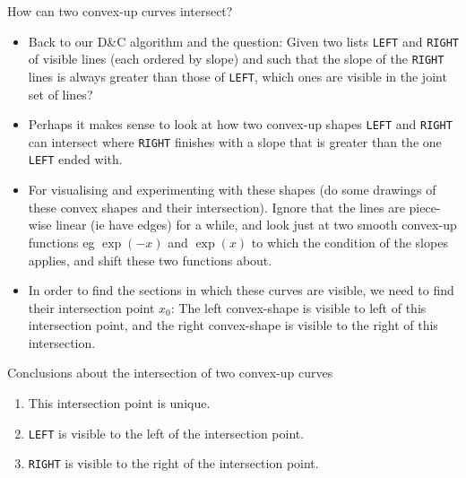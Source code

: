 \documentclass{article}
\begin{document}
\begin{frame}{How can two convex-up curves intersect?}

  \begin{itemize}
  \item 
    Back to our D\&C algorithm and the question: Given two lists
    \texttt{LEFT} and \texttt{RIGHT} of
    visible lines (each ordered by slope) and such that the slope of the
    \texttt{RIGHT} lines is always greater than those of \texttt{LEFT},
    which ones are visible in the joint set of lines?
  \item 
    Perhaps it makes sense to look at how two convex-up shapes
    \texttt{LEFT} and \texttt{RIGHT} can intersect where \texttt{RIGHT}
    finishes with a slope that is greater than the one \texttt{LEFT} ended
    with.
  \item 
    For visualising and experimenting with these shapes (do some
    drawings of these convex shapes and their intersection). Ignore that
    the lines are piece-wise linear (ie have edges) for a while, and
    look just at two smooth convex-up functions eg $\exp(-x)$ and $\exp(x)$ to which the
    condition of the slopes applies, and shift these two functions
    about.
  \item 
    In order to find the sections in which these curves are visible, we
    need to find their intersection point $x_0$: The left convex-shape
    is visible to left of this intersection point, and the right
    convex-shape is visible to the right of this intersection.
  \end{itemize}
\end{frame}

\begin{frame}{Conclusions about the intersection of two convex-up curves}
  
  \begin{enumerate}
  \item This intersection point is unique.
  \item \texttt{LEFT} is visible to the left of the intersection point.
  \item \texttt{RIGHT} is visible to the right of the intersection point.
  \end{enumerate}
\end{frame}
\end{document}
